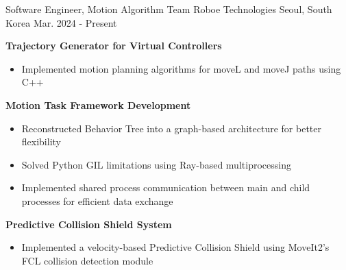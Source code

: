 

\begin{cventries}

  \cventry
    {Software Engineer, Motion Algorithm Team} %
    {Roboe Technologies} %
    {Seoul, South Korea} %
    {Mar. 2024 - Present} %
    {
      \begin{cvitems} %
        \item {\textbf{Trajectory Generator for Virtual Controllers}
          \begin{itemize}[leftmargin=2ex, nosep, noitemsep]
            \setlength{\parskip}{0pt}
            \renewcommand{\labelitemi}{\bullet}
            \item {Implemented motion planning algorithms for moveL and moveJ paths using C++}
          \end{itemize}
        }
        \item {\textbf{Motion Task Framework Development}
          \begin{itemize}[leftmargin=2ex, nosep, noitemsep]
            \setlength{\parskip}{0pt}
            \renewcommand{\labelitemi}{\bullet}
            \item {Reconstructed Behavior Tree into a graph-based architecture for better flexibility}
            \item {Solved Python GIL limitations using Ray-based multiprocessing}
            \item {Implemented shared process communication between main and child processes for efficient data exchange}
          \end{itemize}
        }
        \item {\textbf{Predictive Collision Shield System}
          \begin{itemize}[leftmargin=2ex, nosep, noitemsep]
            \setlength{\parskip}{0pt}
            \renewcommand{\labelitemi}{\bullet}
            \item {Implemented a velocity-based Predictive Collision Shield using MoveIt2’s FCL collision detection module}

\end{itemize}}
\end{cvitems}}
\end{cventries}
